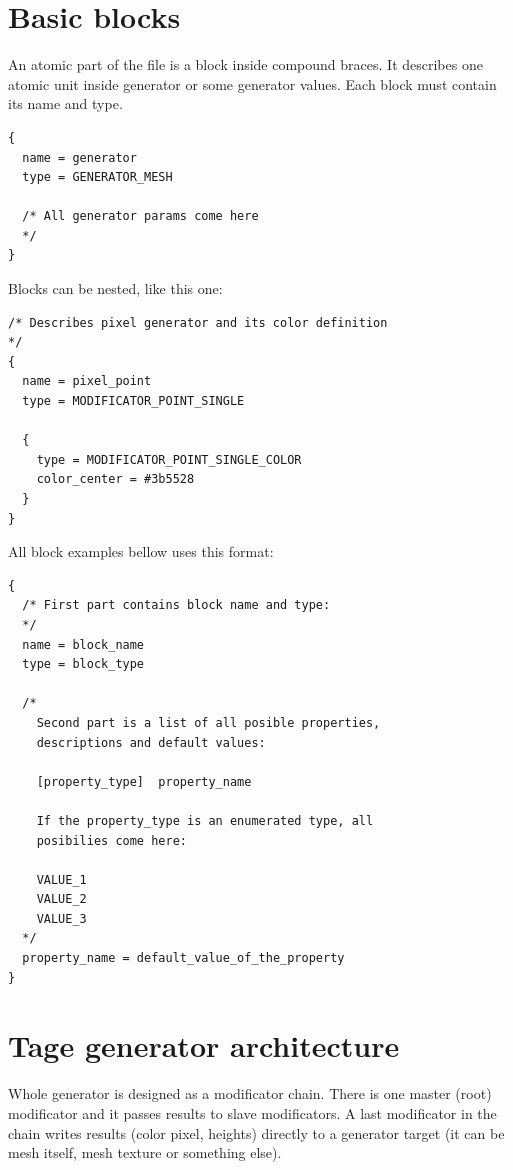 \documentclass[9pt]{article}
\begin{document}
\section{Basic blocks}
An atomic part of the file is a block inside compound braces. It describes one 
atomic unit inside generator or some generator values. Each block must
contain its name and type.
\begin{verbatim}
{
  name = generator
  type = GENERATOR_MESH

  /* All generator params come here
  */
}
\end{verbatim}
Blocks can be nested, like this one:
\begin{verbatim}
/* Describes pixel generator and its color definition
*/
{
  name = pixel_point
  type = MODIFICATOR_POINT_SINGLE

  {
    type = MODIFICATOR_POINT_SINGLE_COLOR
    color_center = #3b5528
  }
}
\end{verbatim}
All block examples bellow uses this format:
\begin{verbatim}
{
  /* First part contains block name and type:
  */
  name = block_name
  type = block_type

  /*
    Second part is a list of all posible properties,
    descriptions and default values:

    [property_type]  property_name
   
    If the property_type is an enumerated type, all 
    posibilies come here:
    
    VALUE_1
    VALUE_2
    VALUE_3
  */  
  property_name = default_value_of_the_property
}
\end{verbatim}

\newpage
\section{Tage generator architecture}
Whole generator is designed as a modificator chain. There is one master (root)
modificator and it passes results to slave modificators. A last modificator 
in the chain writes results (color pixel, heights) directly to a generator target
(it can be mesh itself, mesh texture or something else).
\end{document}
